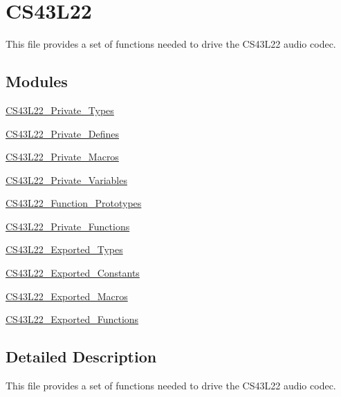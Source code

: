 \hypertarget{group___c_s43_l22}{}\section{C\+S43\+L22}
\label{group___c_s43_l22}


This file provides a set of functions needed to drive the C\+S43\+L22 audio codec.  


\subsection*{Modules}
\begin{DoxyCompactItemize}
\item 
\mbox{\hyperlink{group___c_s43_l22___private___types}{C\+S43\+L22\+\_\+\+Private\+\_\+\+Types}}
\item 
\mbox{\hyperlink{group___c_s43_l22___private___defines}{C\+S43\+L22\+\_\+\+Private\+\_\+\+Defines}}
\item 
\mbox{\hyperlink{group___c_s43_l22___private___macros}{C\+S43\+L22\+\_\+\+Private\+\_\+\+Macros}}
\item 
\mbox{\hyperlink{group___c_s43_l22___private___variables}{C\+S43\+L22\+\_\+\+Private\+\_\+\+Variables}}
\item 
\mbox{\hyperlink{group___c_s43_l22___function___prototypes}{C\+S43\+L22\+\_\+\+Function\+\_\+\+Prototypes}}
\item 
\mbox{\hyperlink{group___c_s43_l22___private___functions}{C\+S43\+L22\+\_\+\+Private\+\_\+\+Functions}}
\item 
\mbox{\hyperlink{group___c_s43_l22___exported___types}{C\+S43\+L22\+\_\+\+Exported\+\_\+\+Types}}
\item 
\mbox{\hyperlink{group___c_s43_l22___exported___constants}{C\+S43\+L22\+\_\+\+Exported\+\_\+\+Constants}}
\item 
\mbox{\hyperlink{group___c_s43_l22___exported___macros}{C\+S43\+L22\+\_\+\+Exported\+\_\+\+Macros}}
\item 
\mbox{\hyperlink{group___c_s43_l22___exported___functions}{C\+S43\+L22\+\_\+\+Exported\+\_\+\+Functions}}
\end{DoxyCompactItemize}


\subsection{Detailed Description}
This file provides a set of functions needed to drive the C\+S43\+L22 audio codec. 

